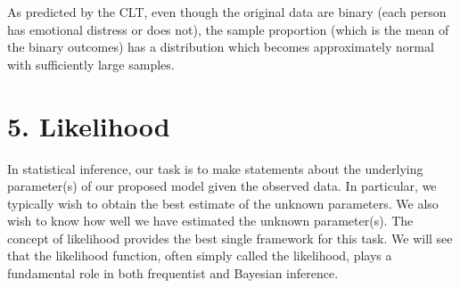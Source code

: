 \documentclass[letterpaper,10pt,english]{jupyterBook}
\begin{document}
\begin{sphinxVerbatim}[commandchars=\\\{\}]
 
         
 
 
\end{sphinxVerbatim}

\noindent{}

\sphinxAtStartPar
As predicted by the CLT, even though the original data are binary (each person has emotional distress or does not), the sample proportion (which is the mean of the binary outcomes) has a distribution which becomes approximately normal with sufficiently large samples.


\chapter{5. Likelihood}
\label{\detokenize{05.a. Likelihood:likelihood}}\label{\detokenize{05.a. Likelihood::doc}}
\sphinxAtStartPar
In statistical inference, our task is to make statements about the underlying parameter(s) of our proposed model given the observed data. In particular, we typically wish to obtain the best estimate of the unknown parameters.  We also wish to know how well we have estimated the unknown parameter(s). The concept of likelihood provides the best single framework for this task. We will see that the likelihood function, often simply called the likelihood, plays a fundamental role in both frequentist and Bayesian inference.
\end{document}
